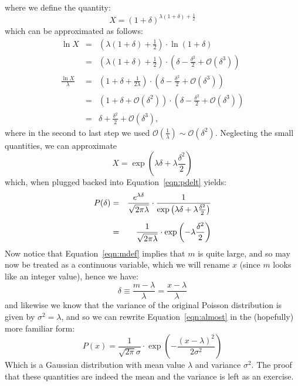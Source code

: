\documentclass[12pt]{article}
\begin{document}
where we define the quantity:
\begin{displaymath}
X = (1+\delta)^{\lambda(1+\delta)+\frac{1}{2}}
\end{displaymath}
which can be approximated as follows:
\begin{eqnarray*}
\ln X &=& \left( \lambda (1+\delta) + \frac{1}{2} \right) \cdot \ln(1+\delta) \\[5pt]
&=& \left( \lambda (1+\delta) + \frac{1}{2} \right) \cdot \left( \delta - \frac{\delta^2}{2} + \mathcal{O}(\delta^3)\right) \\[5pt]
\frac{\ln X}{\lambda}&=& \left( 1+\delta + \frac{1}{2\lambda} \right) \cdot \left( \delta - \frac{\delta^2}{2} + \mathcal{O}(\delta^3)\right) \\[5pt]
&=& \left( 1+\delta + \mathcal{O}\left(\delta^2\right) \right) \cdot \left( \delta - \frac{\delta^2}{2} + \mathcal{O}(\delta^3)\right) \\[5pt]
&=& \delta + \frac{\delta^2}{2}+ \mathcal{O}(\delta^3),
\end{eqnarray*}
where in the second to last step we used $\mathcal{O}\left(\frac{1}{\lambda}\right) \sim \mathcal{O}\left(\delta^2\right)$.  Neglecting the small quantities, we can approximate
\begin{displaymath}
X = \exp\left( \lambda\delta + \lambda\frac{\delta^2}{2} \right) 
\end{displaymath}
which, when plugged backed into Equation~\ref{eqn:pdelt} yields:
\begin{eqnarray}
\label{eqn:almost}
P(\delta) &=& \frac{e^{\lambda\delta}}{\sqrt{2\pi\lambda}} \cdot \frac{1}{\exp\left( \lambda\delta + \lambda\frac{\delta^2}{2} \right)} \notag \\[5pt]
&=& \frac{1}{\sqrt{2\pi\lambda}} \cdot \exp\left( -\lambda \frac{\delta^2}{2}\right)
\end{eqnarray}
Now notice that Equation~\ref{eqn:mdef} implies that $m$ is quite large, and so may now be treated as a continuous variable, which we will rename $x$ (since $m$ looks like an integer value), hence we have:
\begin{displaymath}
\delta \equiv \frac{m - \lambda}{\lambda} = \frac{x - \lambda}{\lambda}
\end{displaymath}
and likewise we know that the variance of the original Poisson distribution is given by $\sigma^2 = \lambda$, and so we can rewrite Equation~\ref{eqn:almost}
in the (hopefully) more familiar form:
\begin{equation}
\label{eqn:gaussian}
P(x) = \frac{1}{\sqrt{2\pi} \sigma} \cdot \exp\left( - \frac{(x - \lambda)^2}{2 \sigma^2}\right)
\end{equation}
Which is a Gaussian distribution with mean value $\lambda$ and variance $\sigma^2$.  The proof that these quantities are indeed the mean and the variance is left as an exercise.
\end{document}
